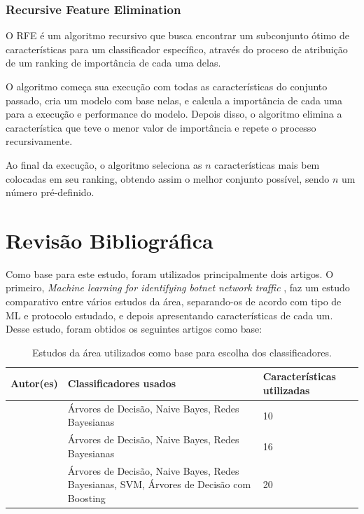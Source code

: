 \subsubsection{Recursive Feature Elimination}

O RFE é um algoritmo recursivo que busca encontrar um subconjunto ótimo de características para um classificador específico, através do proceso de atribuição de um ranking de importância de cada uma delas.

O algoritmo começa sua execução com todas as características do conjunto passado, cria um modelo com base nelas, e calcula a importância de cada uma para a execução e performance do modelo. \cite{muller2017introduction} Depois disso, o algoritmo elimina a característica que teve o menor valor de importância e repete o processo recursivamente.

Ao final da execução, o algoritmo seleciona as $n$ características mais bem colocadas em seu ranking, obtendo assim o melhor conjunto possível, sendo $n$ um número pré-definido. 

\section{Revisão Bibliográfica}

Como base para este estudo, foram utilizados principalmente dois artigos. O primeiro, \textit{Machine learning for identifying botnet network traffic} \cite{12d2f5d1eba245f7bc2acc7487941bd7}, faz um estudo comparativo entre vários estudos da área, separando-os de acordo com tipo de ML e protocolo estudado, e depois apresentando características de cada um. Desse estudo, foram obtidos os seguintes artigos como base:

\begin{table}[h]
\centering
\begin{tabular}{|p{4cm}|p{5cm}|p{3cm}|}
\hline
\textbf{\small Autor(es)} & \textbf{\small Classificadores usados} & \textbf{\small{Características utilizadas}}\\\hline
{\small \cite{livadas2006usilng}} & {\small Árvores de Decisão,
Naive Bayes, 
Redes Bayesianas} & {\small 10}\\\hline
{\small \cite{strayer2008botnet}} & {\small Árvores de Decisão, Naive Bayes, Redes Bayesianas} & {\small 16}\\\hline
{\small \cite{masud2008flow}} & {\small Árvores de Decisão, Naive Bayes, Redes Bayesianas, SVM, Árvores de Decisão com Boosting} & {\small 20}\\\hline
\end{tabular}
\caption{Estudos da área utilizados como base para escolha dos classificadores.}
\label{t.articles}
\end{table}

